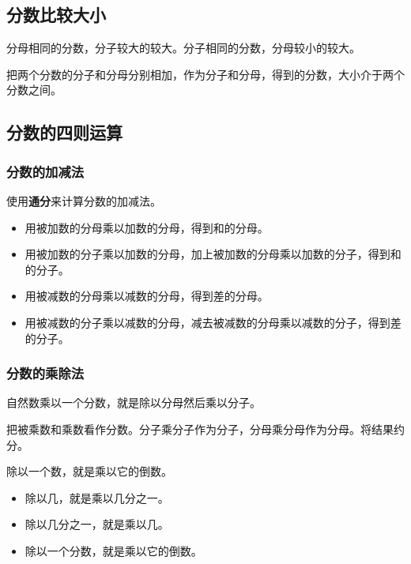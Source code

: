 \documentclass[12pt,UTF8]{ctexart}
\begin{document}
\subsection{分数比较大小}

分母相同的分数，分子较大的较大。分子相同的分数，分母较小的较大。

把两个分数的分子和分母分别相加，作为分子和分母，得到的分数，大小介于两个分数之间。

\subsection{分数的四则运算}

\subsubsection{分数的加减法}

使用\textbf{通分}来计算分数的加减法。

\begin{itemize}
\item 用被加数的分母乘以加数的分母，得到和的分母。
\item 用被加数的分子乘以加数的分母，加上被加数的分母乘以加数的分子，得到和的分子。
\end{itemize}

\begin{itemize}
\item 用被减数的分母乘以减数的分母，得到差的分母。
\item 用被减数的分子乘以减数的分母，减去被减数的分母乘以减数的分子，得到差的分子。
\end{itemize}

\subsubsection{分数的乘除法}

自然数乘以一个分数，就是除以分母然后乘以分子。

把被乘数和乘数看作分数。分子乘分子作为分子，分母乘分母作为分母。将结果约分。

除以一个数，就是乘以它的倒数。

\begin{itemize}
\item 除以几，就是乘以几分之一。
\item 除以几分之一，就是乘以几。
\item 除以一个分数，就是乘以它的倒数。
\end{itemize}
\end{document}
